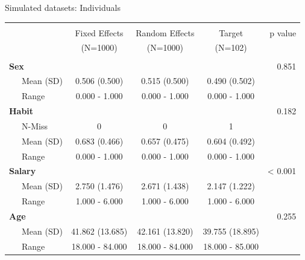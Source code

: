 \documentclass[11pt,ignorenonframetext,]{beamer}
\begin{document}
\begin{frame}{Simulated datasets: Individuals}
\protect\hypertarget{simulated-datasets-individuals}{}

\scriptsize

\begin{table}[!htbp] \centering 
\begin{tabular}{@{\extracolsep{5pt}}lcccr}
\\[-1.8ex]\hline 
\hline \\[-1.8ex] 
 & Fixed Effects  & Random Effects  & Target  & p value\\
 & (N=1000) & (N=1000) & (N=102) &  \\
\hline \\[-1.8ex] 
\textbf{Sex} &  &  &  & 0.851\\
~~~Mean (SD) & 0.506 (0.500) & 0.515 (0.500) & 0.490 (0.502) & \\
~~~Range & 0.000 - 1.000 & 0.000 - 1.000 & 0.000 - 1.000 & \\
\textbf{Habit} &  &  &  & 0.182\\
~~~N-Miss & 0 & 0 & 1 & \\
~~~Mean (SD) & 0.683 (0.466) & 0.657 (0.475) & 0.604 (0.492) & \\
~~~Range & 0.000 - 1.000 & 0.000 - 1.000 & 0.000 - 1.000 & \\
\textbf{Salary} &  &  &  & < 0.001\\
~~~Mean (SD) & 2.750 (1.476) & 2.671 (1.438) & 2.147 (1.222) & \\
~~~Range & 1.000 - 6.000 & 1.000 - 6.000 & 1.000 - 6.000 & \\
\textbf{Age} &  &  &  & 0.255\\
~~~Mean (SD) & 41.862 (13.685) & 42.161 (13.820) & 39.755 (18.895) & \\
~~~Range & 18.000 - 84.000 & 18.000 - 84.000 & 18.000 - 85.000 & \\
\hline
\end{tabular}
\end{table}
\normalsize

\end{frame}
\end{document}
